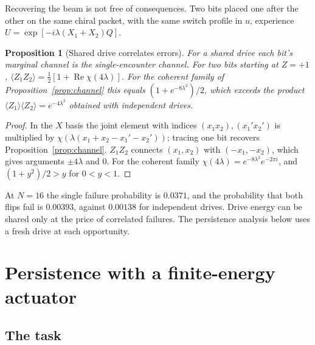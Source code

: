 \documentclass[aps,pre,onecolumn,superscriptaddress,floatfix,longbibliography]{revtex4-2}
\newtheorem{proposition}[theorem]{Proposition}
\begin{document}
Recovering the beam is not free of consequences. Two bits placed one after the other on the same chiral packet, with the same switch profile in $u$, experience $U=\exp[-i\lambda(X_1+X_2)Q]$.

\begin{proposition}[Shared drive correlates errors]
\label{prop:reuse}
For a shared drive each bit's marginal channel is the single-encounter channel. For two bits starting at $Z=+1$, $\langle Z_1Z_2\rangle=\tfrac12[1+\operatorname{Re}\chi(4\lambda)]$. For the coherent family of Proposition~\ref{prop:channel} this equals $(1+e^{-8\lambda^2})/2$, which exceeds the product $\langle Z_1\rangle\langle Z_2\rangle=e^{-4\lambda^2}$ obtained with independent drives.
\end{proposition}

\begin{proof}
In the $X$ basis the joint element with indices $(x_1x_2),(x_1'x_2')$ is multiplied by $\chi(\lambda(x_1+x_2-x_1'-x_2'))$; tracing one bit recovers Proposition~\ref{prop:channel}. $Z_1Z_2$ connects $(x_1,x_2)$ with $(-x_1,-x_2)$, which gives arguments $\pm4\lambda$ and $0$. For the coherent family $\chi(4\lambda)=e^{-8\lambda^2}e^{-2\pi i}$, and $(1+y^2)/2>y$ for $0<y<1$.
\end{proof}

At $N=16$ the single failure probability is $0.0371$, and the probability that both flips fail is $0.00393$, against $0.00138$ for independent drives. Drive energy can be shared only at the price of correlated failures. The persistence analysis below uses a fresh drive at each opportunity.

\section{Persistence with a finite-energy actuator}
\label{sec:persist}

\subsection{The task}
\end{document}
